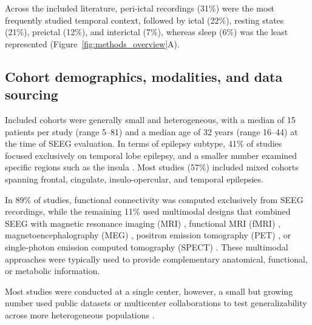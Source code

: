 \documentclass[12pt]{article}
\begin{document}
Across the included literature, peri-ictal recordings (31\%) were the most frequently studied temporal context, followed by ictal (22\%), resting states (21\%), preictal (12\%), and interictal (7\%), whereas sleep (6\%) was the least represented (Figure~\ref{fig:methods_overview}A).


\subsection{Cohort demographics, modalities, and data sourcing}
Included cohorts were generally small and heterogeneous, with a median of 15 patients per study (range 5--81) and a median age of 32 years (range 16--44) at the time of SEEG evaluation. In terms of epilepsy subtype, 41\% of studies focused exclusively on temporal lobe epilepsy, and a smaller number examined specific regions such as the insula \cite{Hagiwara2017-sz}. Most studies (57\%) included mixed cohorts spanning frontal, cingulate, insulo-opercular, and temporal epilepsies.

In 89\% of studies, functional connectivity was computed exclusively from SEEG recordings, while the remaining 11\% used multimodal designs that combined SEEG with magnetic resonance imaging (MRI) \cite{Mo2021-ig}, functional MRI (fMRI) \cite{Bettus2011-jh, Conrad2024-uh}, magnetoencephalography (MEG) \cite{Lopes_da_Silva2013-li}, positron emission tomography (PET) \cite{Wang2019-jl, Wang2021-iw}, or single-photon emission computed tomography (SPECT) \cite{Krishnan2024-sq}. These multimodal approaches were typically used to provide complementary anatomical, functional, or metabolic information.

Most studies were conducted at a single center, however, a small but growing number used public datasets or multicenter collaborations to test generalizability across more heterogeneous populations \cite{Gunnarsdottir2022-la, Weiss2022-xy, Sun2024-bj, Conrad2024-uh, Peng2025-nx, Wang2025-ij, He2025-tw}.
\end{document}
